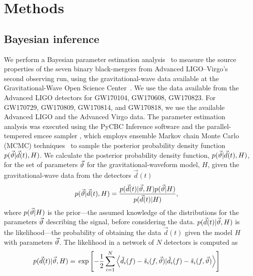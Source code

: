 \section{Methods}\label{sec:pe_analysis}

\subsection{Bayesian inference}

We perform a Bayesian parameter estimation analysis~\cite{Christensen:2001cr} to measure the source properties of the seven binary black-mergers from Advanced LIGO--Virgo's second observing run, using the gravitational-wave data available at the Gravitational-Wave Open Science Center~\cite{Vallisneri:2014vxa}. We use the data available from the Advanced LIGO detectors for GW170104, GW170608, GW170823. For GW170729, GW170809, GW170814, and GW170818, we use the available Advanced LIGO and the Advanced Virgo data. The parameter estimation analysis was executed using the PyCBC Inference software \cite{Biwer:2018osg,alex_nitz_2018_1410598} and the parallel-tempered emcee sampler \cite{emcee,vousden:2016,mcmc}, which employs ensemble Markov chain Monte Carlo (MCMC) techniques~\cite{metropolis1953,geman:1984,Gelman95bayesiandata,Christensen:2001cr,Christensen:2004bc,Rover:2006ni,Rover:2006bb,TheLIGOScientific:2016pea,Abbott:2017vtc,Abbott:2017gyy,Abbott:2017oio} to sample the posterior probability density function $p(\vec{\vartheta}|\vec{d}(t),H)$. We calculate the posterior probability density function, $p(\vec{\vartheta}|\vec{d}(t),H)$, for the set of parameters $\vec{\vartheta}$ for the gravitational-waveform model, $H$, given the gravitational-wave data from the detectors $\vec{d}(t)$~\cite{Vallisneri:2014vxa}
\begin{equation}
\label{eqn:bayes} p(\vec{\vartheta}|\vec{d}(t),H) =
\frac{p(\vec{d}(t)|\vec{\vartheta},H) p(\vec{\vartheta}|H)}{p(\vec{d}(t)|H)} ,
\end{equation}
where $p(\vec{\vartheta}|H)$ is the prior---the assumed knowledge of the distributions for the parameters $\vec{\vartheta}$ describing the signal, before considering the data. $p(\vec{d}(t)|\vec{\vartheta},H)$ is the likelihood---the probability of obtaining the data $\vec{d}(t)$ given the model $H$ with parameters 
$\vec{\vartheta}$. The likelihood in a network of $N$ detectors is computed as~\cite{Biwer:2018osg,Wainstein:1962,Rover:2006bb} 
\begin{equation}\label{eqn:log_likelihood}
p(\vec{d}(t)|\vec{\vartheta},H) = \\
\exp \left[ -\frac{1}{2} \sum_{i = 1}^{N} \left<\tilde{d}_{i}(f) - \tilde{s}_{i}(f, \vec{\vartheta})| \tilde{d}_{i}(f) - \tilde{s}_{i}(f, \vec{\vartheta})\right> \right]
\end{equation}
